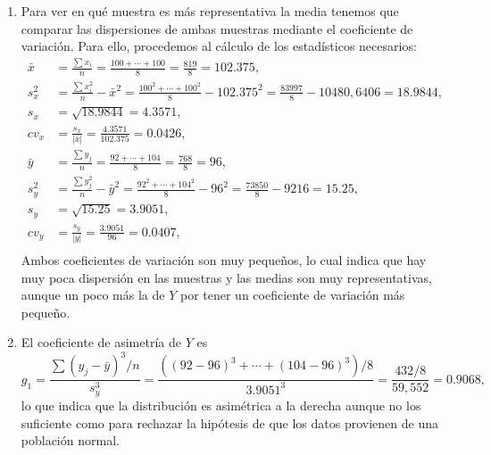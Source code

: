 {\begin{enumerate}
\item Para ver en qué muestra es más representativa la media tenemos que comparar las dispersiones de ambas muestras mediante el coeficiente de variación. Para ello, procedemos al cálculo de los estadísticos necesarios:
\begin{align*}
\bar{x} & = \frac{\sum x_{i}}{n}=\frac{100+\cdots+100}{8}=\frac{819}{8}=102.375,  \\
s_{x}^2 & = \frac{\sum x_{i}^2}{n}-\bar{x}^2 =
\frac{100^2+\cdots+100^2}{8}-102.375^2=\frac{83997}{8}-10480,6406=18.9844,  \\
s_{x} & = \sqrt{18.9844}=4.3571,  \\
cv_x &= \frac{s_x}{|\bar{x}|}= \frac{4.3571}{102.375}=0.0426,\\
\bar{y} & = \frac{\sum y_{j}}{n}=\frac{92+\cdots+104}{8}=
\frac{768}{8}=96,  \\
s_{y}^2 & = \frac{\sum y_{j}^2}{n}-\bar{y}^2 =
\frac{92^2+\cdots+104^2}{8}-96^2=\frac{73850}{8}-9216=15.25,  \\
s_{y} & = \sqrt{15.25}=3.9051,  \\
cv_y &= \frac{s_y}{|\bar{y}|}= \frac{3.9051}{96}=0.0407,\\
\end{align*}
Ambos coeficientes de variación son muy pequeños, lo cual indica que hay muy poca dispersión en las muestras y las medias son muy representativas, aunque un poco más la de $Y$ por tener un coeficiente de variación más pequeño.

\item El coeficiente de asimetría de $Y$ es
\[g_1=\frac{\sum(y_j-\bar{y})^3/n}{s_y^3}=
\frac{\left((92-96)^3+\cdots +(104-96)^3\right)/8}{3.9051^3}=\frac{432/8}{59,552}=0.9068,\]
lo que indica que la distribución es asimétrica a la derecha aunque no los suficiente como para rechazar la hipótesis de que los datos provienen de una población normal.
\end{enumerate}
}


